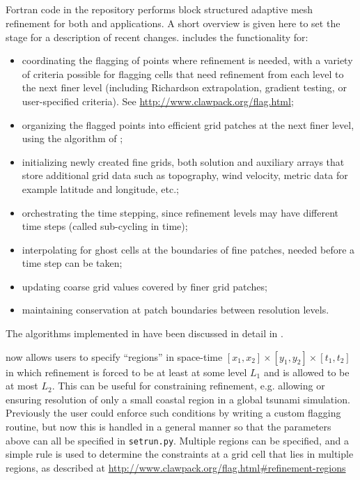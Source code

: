 %
%
%

\subsection{\amrclaw}\label{sec:amrclaw}
Fortran code in the \amrclaw repository performs block structured adaptive mesh
refinement \cite{BO,BC} for both 
\clawpack and \geoclaw  applications.
A short overview is given
here to set the stage for a description of recent changes.
\amrclaw includes the functionality for: 
\begin{itemize}
\item
coordinating the flagging of points where refinement is needed,
with a variety of criteria possible for flagging cells that need refinement
from each level to the next finer level (including Richardson extrapolation,
gradient testing, or user-specified criteria).  See
\url{http://www.clawpack.org/flag.html};
\item
organizing the flagged points into efficient grid
patches at the next finer level, using the algorithm of
\cite{mjb-rig:cluster};
\item
initializing newly created fine grids, both solution and auxiliary arrays that store additional grid data such as topography, wind velocity, metric data for example latitude and longitude, etc.;
\item
orchestrating the time stepping, since refinement levels may have
different time steps ({called sub-cycling in time});
\item
interpolating for ghost cells at the boundaries of fine patches,
needed before a time step can be taken;
\item
updating coarse grid values covered by finer grid patches;
\item
maintaining conservation at patch boundaries between resolution levels.
\end{itemize}
The algorithms implemented in \amrclaw have been discussed in detail in
\cite{mjb-rjl:amrclaw,LeVequeGeorgeBerger:an11}. 

\amrclaw now allows users to specify ``regions'' in space-time 
$[x_1,x_2] \times [y_1,y_2] \times [t_1,t_2]$ in which refinement is forced to
be at least at some level $L_1$ and is allowed to be at most $L_2$.  This can be
useful for constraining refinement, e.g. allowing or ensuring resolution of only a small coastal region in a global tsunami simulation.
Previously the user could enforce such conditions by writing a custom
flagging routine, but now this is handled in a general manner so that the
parameters above can all be specified in \texttt{setrun.py}.  Multiple
regions can be specified, and a simple rule is used to determine the
constraints at a grid cell that lies in multiple regions, as described at
\url{http://www.clawpack.org/flag.html#refinement-regions}

